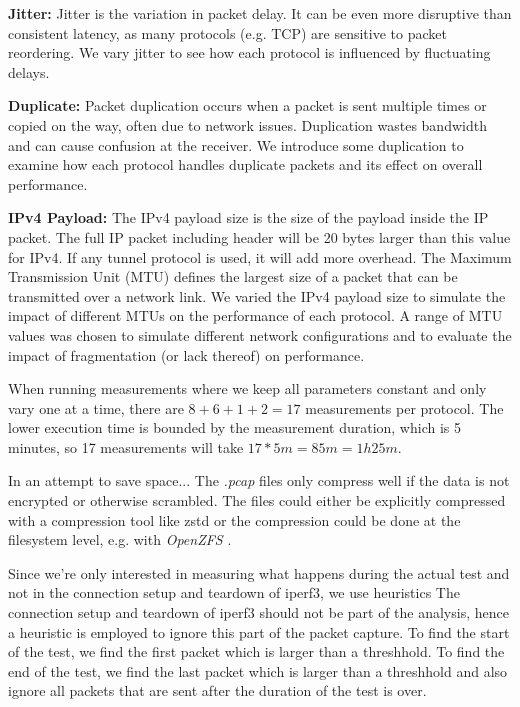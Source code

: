\noindent\textbf{Jitter:} Jitter is the variation in packet delay.
It can be even more disruptive than consistent latency, as many protocols (e.g. TCP) are sensitive to packet reordering.
We vary jitter to see how each protocol is influenced by fluctuating delays.

\noindent\textbf{Duplicate:} Packet duplication occurs when a packet is sent multiple times or copied on the way, often due to network issues.
Duplication wastes bandwidth and can cause confusion at the receiver.
We introduce some duplication to examine how each protocol handles duplicate packets and its effect on overall performance.

\noindent\textbf{IPv4 Payload:} The IPv4 payload size is the size of the payload inside the IP packet.
The full IP packet including header will be 20 bytes larger than this value for IPv4.
If any tunnel protocol is used, it will add more overhead.
The Maximum Transmission Unit (MTU) defines the largest size of a packet that can be transmitted over a network link.
We varied the IPv4 payload size to simulate the impact of different MTUs on the performance of each protocol.
A range of MTU values was chosen to simulate different network configurations and to evaluate the impact of fragmentation (or lack thereof) on performance.


When running measurements where we keep all parameters constant and only vary one at a time, there are $8 + 6 + 1 + 2 = 17$ measurements per protocol.
The lower execution time is bounded by the measurement duration, which is 5 minutes, so 17 measurements will take $17 * 5 m = 85 m = 1h25m$.


In an attempt to save space...
The \textit{.pcap} \cite{wiki:Pcap} files only compress well if the data is not encrypted or otherwise scrambled.
The files could either be explicitly compressed with a compression tool like zstd or the compression could be done at the filesystem level, e.g. with \textit{OpenZFS} \cite{OpenZFS}. 


Since we're only interested in measuring what happens during the actual test and not in the connection setup and teardown of iperf3, we use heuristics
The connection setup and teardown of iperf3 should not be part of the analysis, hence a heuristic is employed to ignore this part of the packet capture.
To find the start of the test, we find the first packet which is larger than a threshhold.
To find the end of the test, we find the last packet which is larger than a threshhold and also ignore all packets that are sent after the duration of the test is over.

